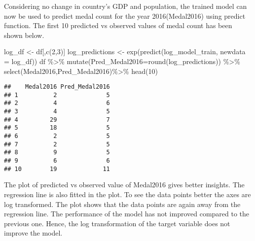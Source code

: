 \documentclass[
]{article}
\newenvironment{Shaded}{\begin{snugshade}}{\end{snugshade}}
\newcommand{\AttributeTok}[1]{\textcolor[rgb]{0.77,0.63,0.00}{#1}}
\newcommand{\DecValTok}[1]{\textcolor[rgb]{0.00,0.00,0.81}{#1}}
\newcommand{\FunctionTok}[1]{\textcolor[rgb]{0.00,0.00,0.00}{#1}}
\newcommand{\NormalTok}[1]{#1}
\newcommand{\OtherTok}[1]{\textcolor[rgb]{0.56,0.35,0.01}{#1}}
\newcommand{\SpecialCharTok}[1]{\textcolor[rgb]{0.00,0.00,0.00}{#1}}
\begin{document}
Considering no change in country's GDP and population, the trained model
can now be used to predict medal count for the year 2016(Medal2016)
using predict function. The first 10 predicted vs observed values of
medal count has been shown below.

\begin{Shaded}
\begin{Highlighting}[]
\NormalTok{log\_df }\OtherTok{\textless{}{-}}\NormalTok{ df[,}\FunctionTok{c}\NormalTok{(}\DecValTok{2}\NormalTok{,}\DecValTok{3}\NormalTok{)]}
\NormalTok{log\_predictions }\OtherTok{\textless{}{-}} \FunctionTok{exp}\NormalTok{(}\FunctionTok{predict}\NormalTok{(log\_model\_train, }\AttributeTok{newdata =}\NormalTok{ log\_df))}
\NormalTok{df }\SpecialCharTok{\%\textgreater{}\%}
  \FunctionTok{mutate}\NormalTok{(}\AttributeTok{Pred\_Medal2016=}\FunctionTok{round}\NormalTok{(log\_predictions)) }\SpecialCharTok{\%\textgreater{}\%}
  \FunctionTok{select}\NormalTok{(Medal2016,Pred\_Medal2016)}\SpecialCharTok{\%\textgreater{}\%}
  \FunctionTok{head}\NormalTok{(}\DecValTok{10}\NormalTok{)}
\end{Highlighting}
\end{Shaded}

\begin{verbatim}
##    Medal2016 Pred_Medal2016
## 1          2              5
## 2          4              6
## 3          4              5
## 4         29              7
## 5         18              5
## 6          2              5
## 7          2              5
## 8          9              5
## 9          6              6
## 10        19             11
\end{verbatim}

The plot of predicted vs observed value of Medal2016 gives better
insights. The regression line is also fitted in the plot. To see the
data points better the axes are log transformed. The plot shows that the
data points are again away from the regression line. The performance of
the model has not improved compared to the previous one. Hence, the log
transformation of the target variable does not improve the model.
\end{document}
